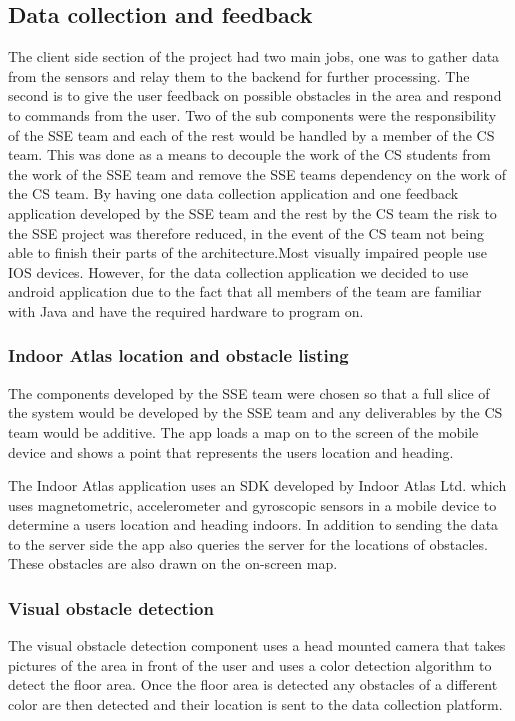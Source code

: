 \documentclass[prodmode,acmtosem]{acmsmall} %
\begin{document}
\subsection{Data collection and feedback}
The client side section of the project had two main jobs, one was to gather data from the sensors and relay them to the backend for further processing. The second is to give the user feedback on possible obstacles in the area and respond to commands from the user. Two of the sub components were the responsibility of the SSE team and each of the rest would be handled by a member of the CS team. This was done as a means to decouple the work of the CS students from the work of the SSE team and remove the SSE teams dependency on the work of the CS team. By having one data collection application and one feedback application developed by the SSE team and the rest by the CS team the risk to the SSE project was therefore reduced, in the event of the CS team not being able to finish their parts of the architecture.Most visually impaired people use IOS devices. However, for the data collection application we decided to use android application due to the fact that all members of the team are familiar with Java and have the required hardware to program on.

\subsubsection{Indoor Atlas location and obstacle listing}
The components developed by the SSE team were chosen so that a full slice of the system would be developed by the SSE team and any deliverables by the CS team would be additive. The app loads a map on to the screen of the mobile device and shows a point that represents the users location and heading.

The Indoor Atlas application uses an SDK developed by Indoor Atlas Ltd. \cite{IndoorAtlas} which uses magnetometric, accelerometer and gyroscopic sensors in a mobile device to determine a users location and heading indoors. In addition to sending the data to the server side the app also queries the server for the locations of obstacles. These obstacles are also drawn on the on-screen map.

\subsubsection{Visual obstacle detection}
The visual obstacle detection component uses a head mounted camera that takes pictures of the area in front of the user and uses a color detection algorithm to detect the floor area. Once the floor area is detected any obstacles of a different color are then detected and their location is sent to the data collection platform.
\end{document}
